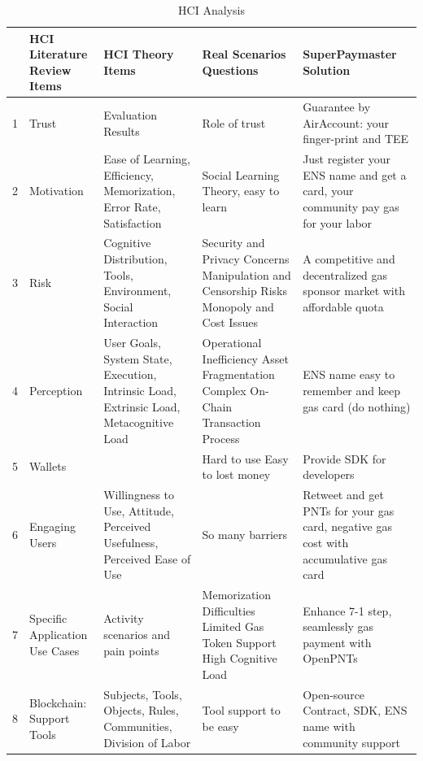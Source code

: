 \documentclass[preprint,12pt]{elsarticle}
\begin{document}
\begin{table}[htbp]
\centering
\footnotesize
\renewcommand{\arraystretch}{0.9}
\begin{tabularx}{\textwidth}{|c|X|X|X|X|}
\hline
\textbf{} & \textbf{HCI Literature Review Items} & \textbf{HCI Theory Items} & \textbf{Real Scenarios Questions} & \textbf{SuperPaymaster Solution} \\
\hline
1 & Trust & Evaluation Results & Role of trust & Guarantee by AirAccount: your finger-print and TEE \\
\hline
2 & Motivation & Ease of Learning, Efficiency, Memorization, Error Rate, Satisfaction & Social Learning Theory, easy to learn & Just register your ENS name and get a card, your community pay gas for your labor \\
\hline
3 & Risk & Cognitive Distribution, Tools, Environment, Social Interaction & Security and Privacy Concerns Manipulation and Censorship Risks Monopoly and Cost Issues & A competitive and decentralized gas sponsor market with affordable quota \\
\hline
4 & Perception & User Goals, System State, Execution, Intrinsic Load, Extrinsic Load, Metacognitive Load & Operational Inefficiency Asset Fragmentation Complex On-Chain Transaction Process & ENS name easy to remember and keep gas card (do nothing) \\
\hline
5 & Wallets &  & Hard to use Easy to lost money & Provide SDK for developers \\
\hline
6 & Engaging Users & Willingness to Use, Attitude, Perceived Usefulness, Perceived Ease of Use & So many barriers & Retweet and get PNTs for your gas card, negative gas cost with accumulative gas card \\
\hline
7 & Specific Application Use Cases & Activity scenarios and pain points & Memorization Difficulties Limited Gas Token Support High Cognitive Load & Enhance 7-1 step, seamlessly gas payment with OpenPNTs \\
\hline
8 & Blockchain: Support Tools & Subjects, Tools, Objects, Rules, Communities, Division of Labor & Tool support to be easy & Open-source Contract, SDK, ENS name with community support \\
\hline
\end{tabularx}
\caption{HCI Analysis\cite{frohlich2022,shneiderman2010}}
\label{tab:hci-analysis}
\end{table}
\end{document}

